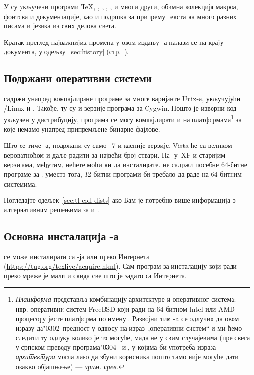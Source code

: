 \documentclass{article}
\begin{document}
У \TL{} су укључени програми \TeX{}, \LaTeXe{}, \ConTeXt, \MF, \MP,
\BibTeX{} и многи други, обимна колекција макроа, фонтова и
документације, као и подршка за припрему текста на много разних
писама и језика из свих делова света.

Кратак преглед најважнијих промена у овом издању \TL{}-а налази се на
крају документа, у одељку~\ref{sec:history}
(стр.~\pageref{sec:history}).


\subsection{Подржани оперативни системи}
\label{sec:os-support}

\TL{} садржи унапред компајлиране програме за многе варијанте Unix-а,
укључујући \GNU/Linux и \MacOSX. Такође, ту су и верзије програма за
Cygwin. Пошто је изворни код укључен у дистрибуцију, програми се могу
компајлирати и на платформама\footnote{\textserbian{\emph{Платформа}
представља комбинацију архитектуре и оперативног система: нпр.
оперативни систем FreeBSD који ради на 64-битном Intel
или AMD процесору јесте платформа по имену
. Развојни тим \TL{}-a се одлучио да овом
изразу да\char"0302\ предност у односу на израз „оперативни систем“ и
ми ћемо следити ту одлуку колико је то могуће, мада не у свим
случајевима (пре свега у српском преводу програма\char"0304\
 и , у којима би употреба израза
\emph{архитектура} могла лако да збуни корисника пошто тамо није
могуће дати овакво објашњење) --- \emph{прим. прев.}}} за које немамо
унапред припремљене бинарне фајлове.

Што се тиче \Windows{}-а, подржани су само \Windows{}~7
и касније верзије. \Windows{} \textenglish{Vista} ће са
великом вероватноћом и даље радити за највећи број ствари. На 
\Windows{}-у~XP и старијим верзијама, међутим, \TL{} нећете
моћи ни да инсталирате. \TL{} не садржи
посебне 64-битне програме за \Windows{}; уместо тога, 32-битни
програми би требало да раде на 64-битним системима.

Погледајте одељек~\ref{sec:tl-coll-dists} ако Вам је потребно више
информација о алтернативним решењима за \Windows{} и \MacOSX.


\subsection{Основна инсталација \protect\TL{}-а}
\label{sec:basic}

\TL{} се може инсталирати са \DVD{}-ја или преко Интернета
(\url{https://tug.org/texlive/acquire.html}). Сам програм за
инсталацију који ради преко мреже је мали и скида све што је задато
са Интернета.
\end{document}
